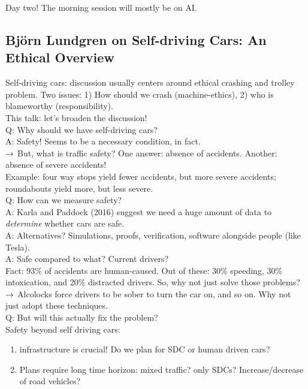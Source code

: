 Day two! The morning session will mostly be on AI.

\subsection{Bj{\" o}rn Lundgren on Self-driving Cars: An Ethical Overview}

Self-driving cars: discussion usually centers around ethical crashing and trolley problem. Two issues: 1) How should we crash (machine-ethics), 2) who is blameworthy (responsibility). \\

This talk: let's broaden the discussion! \\

Q: Why should we have self-driving cars? \\

A: Safety! Seems to be a necessary condition, in fact. \\

$\rightarrow$ But, what is traffic safety? One answer: absence of accidents. Another: absence of severe accidents! \\

Example: four way stops yield fewer accidents, but more severe accidents; roundabouts yield more, but less severe. \\

Q: How can we measure safety? \\

A: Karla and Paddock (2016) suggest we need a huge amount of data to {\it determine} whether cars are safe. \\

A: Alternatives? Simulations, proofs, verification, software alongside people (like Tesla). \\

A: Safe compared to what? Current drivers? \\

Fact: 93\% of accidents are human-caused. Out of these: 30\% speeding, 30\% intoxication, and 20\% distracted drivers. So, why not just solve those problems? \\

$\rightarrow$ Alcolocks force drivers to be sober to turn the car on, and so on. Why not just adopt these techniques. \\

Q: But will this actually fix the problem? \\


Safety beyond self driving cars:
\begin{enumerate}
    \item infrastructure is crucial! Do we plan for SDC or human driven cars?
    \item Plans require long time horizon: mixed traffic? only SDCs? Increase/decrease of road vehicles?
\end{enumerate}

